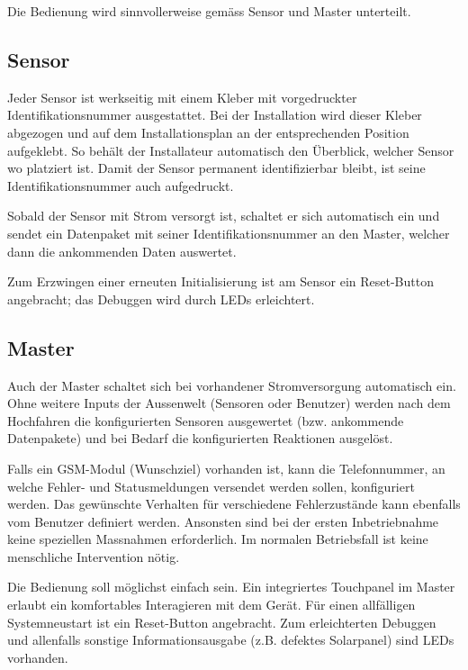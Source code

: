 Die Bedienung wird sinnvollerweise gem\"ass Sensor und Master unterteilt.



\subsection{Sensor}

Jeder   Sensor   ist   werkseitig   mit   einem   Kleber   mit   vorgedruckter
Identifikationsnummer  ausgestattet. Bei der  Installation wird  dieser Kleber
abgezogen  und  auf  dem  Installationsplan  an  der  entsprechenden  Position
aufgeklebt. So beh\"alt der Installateur  automatisch den \"Uberblick, welcher
Sensor wo  platziert ist. Damit  der Sensor permanent  identifizierbar bleibt,
ist seine Identifikationsnummer auch aufgedruckt.

Sobald der Sensor mit Strom versorgt ist, schaltet er sich automatisch ein und
sendet ein Datenpaket mit seiner  Identifikationsnummer an den Master, welcher
dann die ankommenden Daten auswertet.

Zum Erzwingen  einer erneuten Initialisierung  ist am Sensor  ein Reset-Button
angebracht; das Debuggen wird durch LEDs erleichtert.


\subsection{Master}


Auch  der Master  schaltet  sich bei  vorhandener Stromversorgung  automatisch
ein.  Ohne weitere Inputs der  Aussenwelt (Sensoren oder Benutzer) werden nach
dem  Hochfahren  die  konfigurierten  Sensoren  ausgewertet  (bzw.  ankommende
Datenpakete) und bei Bedarf die konfigurierten Reaktionen ausgel\"ost.

Falls ein  GSM-Modul (Wunschziel)  vorhanden ist,  kann die  Telefonnummer, an
welche  Fehler-  und  Statusmeldungen versendet  werden  sollen,  konfiguriert
werden. Das  gew\"unschte Verhalten  f\"ur verschiedene  Fehlerzust\"ande kann
ebenfalls  vom  Benutzer  definiert  werden. Ansonsten  sind  bei  der  ersten
Inbetriebnahme   keine   speziellen   Massnahmen   erforderlich. Im   normalen
Betriebsfall ist keine menschliche Intervention n\"otig.

Die  Bedienung  soll  m\"oglichst einfach  sein. Ein  integriertes  Touchpanel
im  Master  erlaubt ein  komfortables  Interagieren  mit dem  Ger\"at.   F\"ur
einen  allf\"alligen  Systemneustart  ist ein  Reset-Button  angebracht.   Zum
erleichterten  Debuggen  und  allenfalls  sonstige  Informationsausgabe  (z.B.
defektes Solarpanel) sind LEDs vorhanden.
